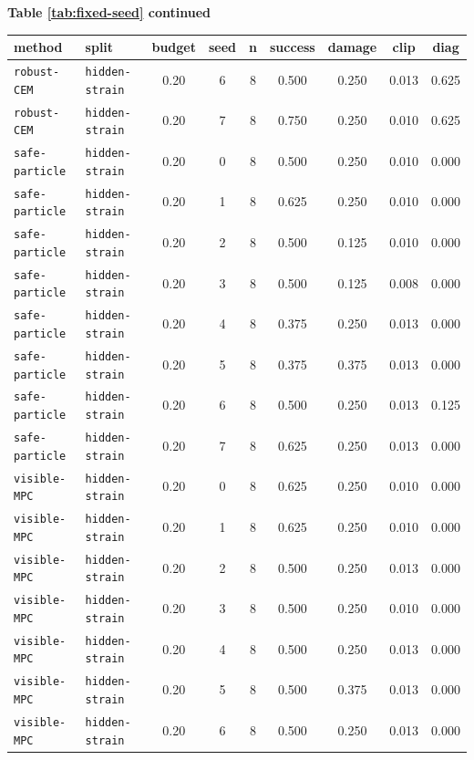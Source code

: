 \documentclass{article}
\begin{document}
\begin{center}
\textbf{Table \ref{tab:fixed-seed} continued}\\[0.4ex]
\begin{tabular}{llccccccc}
\toprule
method & split & budget & seed & n & success & damage & clip & diag \\
\midrule
\texttt{robust-CEM} & \texttt{hidden-strain} & 0.20 & 6 & 8 & 0.500 & 0.250 & 0.013 & 0.625 \\
\texttt{robust-CEM} & \texttt{hidden-strain} & 0.20 & 7 & 8 & 0.750 & 0.250 & 0.010 & 0.625 \\
\texttt{safe-particle} & \texttt{hidden-strain} & 0.20 & 0 & 8 & 0.500 & 0.250 & 0.010 & 0.000 \\
\texttt{safe-particle} & \texttt{hidden-strain} & 0.20 & 1 & 8 & 0.625 & 0.250 & 0.010 & 0.000 \\
\texttt{safe-particle} & \texttt{hidden-strain} & 0.20 & 2 & 8 & 0.500 & 0.125 & 0.010 & 0.000 \\
\texttt{safe-particle} & \texttt{hidden-strain} & 0.20 & 3 & 8 & 0.500 & 0.125 & 0.008 & 0.000 \\
\texttt{safe-particle} & \texttt{hidden-strain} & 0.20 & 4 & 8 & 0.375 & 0.250 & 0.013 & 0.000 \\
\texttt{safe-particle} & \texttt{hidden-strain} & 0.20 & 5 & 8 & 0.375 & 0.375 & 0.013 & 0.000 \\
\texttt{safe-particle} & \texttt{hidden-strain} & 0.20 & 6 & 8 & 0.500 & 0.250 & 0.013 & 0.125 \\
\texttt{safe-particle} & \texttt{hidden-strain} & 0.20 & 7 & 8 & 0.625 & 0.250 & 0.013 & 0.000 \\
\texttt{visible-MPC} & \texttt{hidden-strain} & 0.20 & 0 & 8 & 0.625 & 0.250 & 0.010 & 0.000 \\
\texttt{visible-MPC} & \texttt{hidden-strain} & 0.20 & 1 & 8 & 0.625 & 0.250 & 0.010 & 0.000 \\
\texttt{visible-MPC} & \texttt{hidden-strain} & 0.20 & 2 & 8 & 0.500 & 0.250 & 0.013 & 0.000 \\
\texttt{visible-MPC} & \texttt{hidden-strain} & 0.20 & 3 & 8 & 0.500 & 0.250 & 0.010 & 0.000 \\
\texttt{visible-MPC} & \texttt{hidden-strain} & 0.20 & 4 & 8 & 0.500 & 0.250 & 0.013 & 0.000 \\
\texttt{visible-MPC} & \texttt{hidden-strain} & 0.20 & 5 & 8 & 0.500 & 0.375 & 0.013 & 0.000 \\
\texttt{visible-MPC} & \texttt{hidden-strain} & 0.20 & 6 & 8 & 0.500 & 0.250 & 0.013 & 0.000 \\

\end{tabular}
\end{center}
\end{document}
